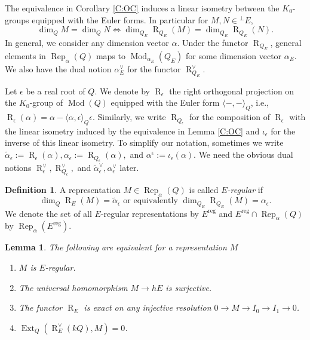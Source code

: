 \documentclass{amsart}
\newtheorem{lemma}[theorem]{Lemma}
\theoremstyle{definition}
\newtheorem{definition}[theorem]{Definition}
\theoremstyle{remark}
\numberwithin{equation}{section}
\begin{document}
The equivalence in Corollary \ref{C:OC} induces a linear isometry between the $K_0$-groups equipped with the Euler forms. In particular for $M,N\in{{^\perp}\!} E$,
$$\dim_Q M=\dim_Q N\iff\dim_{Q_E}{\operatorname{R}}_{Q_E}(M)=\dim_{Q_E}{\operatorname{R}}_{Q_E}(N).$$
In general, we consider any dimension vector $\alpha$. Under the functor ${\operatorname{R}}_{Q_E}$, general elements in ${\operatorname{Rep}}_\alpha(Q)$ maps to ${\operatorname{Mod}}_{\alpha_E}(Q_E)$ for some dimension vector $\alpha_E$. We also have the dual notion $\alpha_E^\vee$ for the functor ${\operatorname{R}}_{Q_E}^\vee$.

Let $\epsilon$ be a real root of $Q$. We denote by ${\operatorname{R}}_\epsilon$ the right orthogonal projection on the $K_0$-group of ${\operatorname{Mod}}(Q)$ equipped with the Euler form ${\langle{-,-}\rangle}_Q$, i.e., ${\operatorname{R}}_\epsilon(\alpha)=\alpha-{\langle{\alpha,\epsilon}\rangle}_Q\epsilon$. Similarly, we write ${\operatorname{R}}_{Q_\epsilon}$ for the composition of ${\operatorname{R}}_\epsilon$ with the linear isometry induced by the equivalence in Lemma \ref{C:OC} and $\iota_\epsilon$ for the inverse of this linear isometry.
To simplify our notation, sometimes we write $\tilde{\alpha}_\epsilon:={\operatorname{R}}_\epsilon(\alpha),\alpha_{\epsilon}:={\operatorname{R}}_{Q_\epsilon}(\alpha),$ and $\alpha^\epsilon:=\iota_\epsilon(\alpha)$. We need the obvious dual notions ${\operatorname{R}}_\epsilon^\vee,{\operatorname{R}}_{Q_\epsilon}^\vee,$ and $\tilde{\alpha}_\epsilon^\vee, \alpha_\epsilon^\vee$ later.

\begin{definition} A representation $M\in{\operatorname{Rep}}_\alpha(Q)$ is called {\em $E$-regular} if
$$\dim_Q{\operatorname{R}}_E(M)=\tilde{\alpha}_\epsilon \text{ or equivalently }\dim_{Q_E}{\operatorname{R}}_{Q_E}(M)=\alpha_{\epsilon}.$$
We denote the set of all $E$-regular representations by $E^{{\operatorname{reg}}}$ and $E^{{\operatorname{reg}}}\cap{\operatorname{Rep}}_\alpha(Q)$ by ${\operatorname{Rep}}_\alpha(E^{{\operatorname{reg}}})$.
\end{definition}

\begin{lemma} \label{L:Ereg} The following are equivalent for a representation $M$ \begin{enumerate}
\item $M$ is $E$-regular.
\item The universal homomorphism $M\to hE$ is surjective.
\item The functor ${\operatorname{R}}_E$ is exact on any injective resolution $0\to M\to I_0\to I_1\to 0$.
\item ${\operatorname{Ext}}_Q({\operatorname{R}}_E^\vee(kQ),M)=0$.
\end{enumerate}
\end{lemma}
\end{document}
